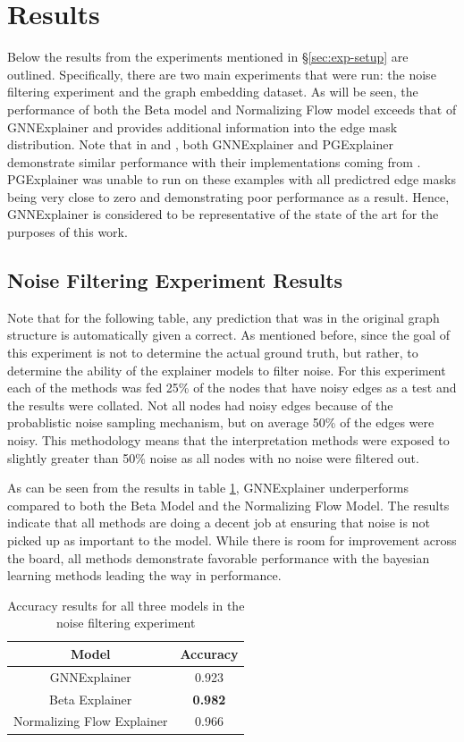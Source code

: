 \section{Results}
Below the results from the experiments mentioned in \S\ref{sec:exp-setup} are outlined. Specifically, there are two main experiments that were run: the noise filtering experiment and the graph embedding dataset. As will be seen, the performance of both the Beta model and Normalizing Flow model exceeds that of GNNExplainer and provides additional information into the edge mask distribution. Note that in \cite{yuan_explainability_2021} and \cite{lin_generative_2021}, both GNNExplainer and PGExplainer demonstrate similar performance with their implementations coming from \cite{fey_fast_2019}. PGExplainer was unable to run on these examples with all predictred edge masks being very close to zero and demonstrating poor performance as a result. Hence, GNNExplainer is considered to be representative of the state of the art for the purposes of this work.

\subsection{Noise Filtering Experiment Results}
Note that for the following table, any prediction that was in the original graph structure is automatically given a correct. As mentioned before, since the goal of this experiment is not to determine the actual ground truth, but rather, to determine the ability of the explainer models to filter noise. For this experiment each of the methods was fed 25\% of the nodes that have noisy edges as a test and the results were collated. Not all nodes had noisy edges because of the probablistic noise sampling mechanism, but on average 50\% of the edges were noisy. This methodology means that the interpretation methods were exposed to slightly greater than 50\% noise as all nodes with no noise were filtered out.

As can be seen from the results in table \ref{tab:noise-filter-res}, GNNExplainer underperforms compared to both the Beta Model and the Normalizing Flow Model. The results indicate that all methods are doing a decent job at ensuring that noise is not picked up as important to the model. While there is room for improvement across the board, all methods demonstrate favorable performance with the bayesian learning methods leading the way in performance.
\begin{table}[h] 
	\centering
	\begin{tabular}{|c||c|} \hline
	Model & Accuracy\\ \hline \hline
	GNNExplainer & 0.923\\ 
	Beta Explainer & \textbf{0.982}\\ 
	Normalizing Flow Explainer & 0.966\\ \hline
	\end{tabular}
	\caption{Accuracy results for all three models in the noise filtering experiment}
	\label{tab:noise-filter-res}
\end{table}


